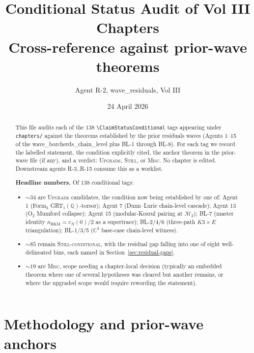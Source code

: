 \documentclass[11pt]{amsart}
\providecommand{\kBKM}{\kappa_{\mathrm{BKM}}}
\providecommand{\Mbar}{\overline{\mathcal{M}}}
\providecommand{\Q}{\mathbb{Q}}
\providecommand{\C}{\mathbb{C}}
\begin{document}
\title{Conditional Status Audit of Vol III Chapters\\
Cross-reference against prior-wave theorems}
\author{Agent R-2, wave\_residuals, Vol III}
\date{24 April 2026}
\maketitle

\begin{abstract}
This file audits each of the $138$ \texttt{\textbackslash ClaimStatusConditional}
tags appearing under \texttt{chapters/} against the theorems established by the
prior residuals waves (Agents 1--15 of the wave\_borcherds\_chain\_level
plus BL-1 through BL-8). For each tag we record the labelled
statement, the condition explicitly cited, the anchor theorem in the
prior-wave file (if any), and a verdict: \textsc{Upgrade}, \textsc{Still}, or \textsc{Misc}.
No chapter is edited. Downstream agents R-3..R-15 consume this as a worklist.

\medskip
\textbf{Headline numbers.} Of $138$ conditional tags:
\begin{itemize}[leftmargin=*]
\item $\sim 34$ are \textsc{Upgrade} candidates, the condition now being
  established by one of: Agent 1 (Form$_3$ GRT$_1(\Q)$-torsor);
  Agent 7 (Dunn--Lurie chain-level cascade); Agent 13 (O$_2$ Mumford
  collapse); Agent 15 (modular-Koszul pairing at $\Mbar_2$); BL-7
  (master identity $\kBKM = c_N(0)/2$ as a supertrace);
  BL-2/4/6 (three-path $K3 \times E$ triangulation);
  BL-1/3/5 ($\C^3$ base-case chain-level witness).
\item $\sim 85$ remain \textsc{Still-conditional}, with the residual gap
  falling into one of eight well-delineated bins, each named in
  Section~\ref{sec:residual-gaps}.
\item $\sim 19$ are \textsc{Misc}, scope needing a chapter-local
  decision (typically an embedded theorem where one of several
  hypotheses was cleared but another remains, or where the upgraded
  scope would require rewording the statement).
\end{itemize}
\end{abstract}

\tableofcontents

\section{Methodology and prior-wave anchors}
\label{sec:methodology}
\end{document}
